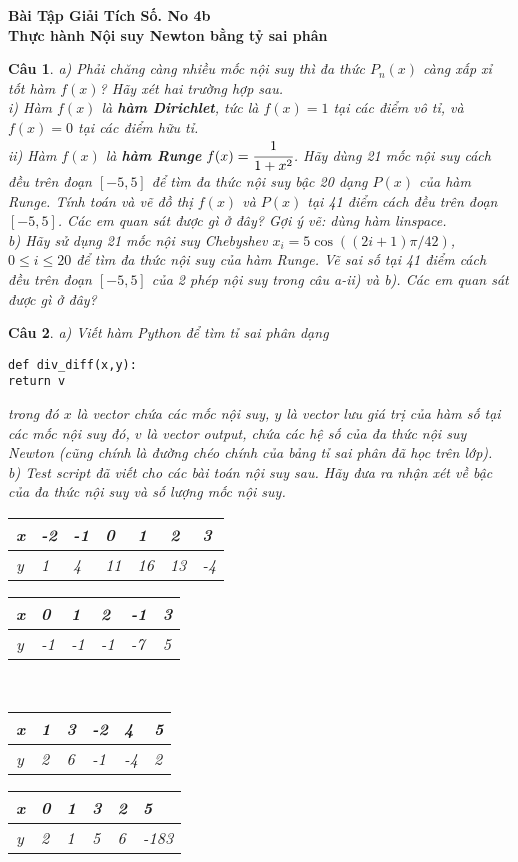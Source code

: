 \documentclass[11pt]{article}
\newtheorem{bt}{Câu}
\begin{document}



\begin{center}
	{\bf Bài Tập Giải Tích Số. No 4b \\ Thực hành Nội suy Newton bằng tỷ sai phân}
\end{center}
%

\begin{bt} %
a) Phải chăng càng nhiều mốc nội suy thì đa thức $P_n(x)$ càng xấp xỉ tốt hàm $f(x)$? Hãy xét hai trường hợp sau.\\
i) Hàm $f(x)$ là \textbf{hàm Dirichlet}, tức là $f(x)=1$ tại các điểm vô tỉ, và $f(x)=0$ tại các điểm hữu tỉ. \\
ii) Hàm $f(x)$ là \textbf{hàm Runge} $f(x) = \cfrac{1}{1+x^2}$. Hãy dùng 21 mốc nội suy cách đều trên đoạn $[-5, 5]$ để tìm đa thức nội suy bậc 20 dạng $P(x)$ của hàm Runge. Tính toán và vẽ đồ thị $f(x)$ và $P(x)$ tại 41 điểm cách đều trên đoạn $[-5, 5]$. Các em quan sát được gì ở đây? Gợi ý vẽ: dùng hàm linspace.\\
b) Hãy sử dụng 21 mốc nội suy Chebyshev $x_i=5\cos((2i+1)\pi/42)$, $0\leq i\leq 20$ để tìm đa thức nội suy của hàm Runge. Vẽ sai số tại 41 điểm cách đều trên đoạn $[-5, 5]$ của 2 phép nội suy trong câu a-ii) và b). Các em quan sát được gì ở đây?
\end{bt}

\begin{bt} a) Viết hàm Python để tìm tỉ sai phân dạng 
%
\begin{lstlisting}[frame=single] 
def div_diff(x,y):
return v
\end{lstlisting}
%
trong đó $x$ là vector chứa các mốc nội suy, $y$ là vector lưu giá trị của hàm số tại các mốc nội suy đó, $v$ là vector output, chứa các hệ số của đa thức nội suy Newton (cũng chính là đường chéo chính của bảng tỉ sai phân đã học trên lớp). \\
b) Test script đã viết cho các bài toán nội suy sau. Hãy đưa ra nhận xét về bậc của đa thức nội suy và số lượng mốc nội suy.  \\
\begin{tabular}[7]{l|l|l|l|l|l|l}
	x & -2 & -1 & 0  & 1  & 2  & 3 \\ \hline 
	y & 1  & 4  & 11 & 16 & 13 & -4
\end{tabular}	
\hfill 
\begin{tabular}[6]{l|l|l|l|l|l}
	x & 0 & 1 & 2  & -1  & 3 \\ \hline 
	y & -1  & -1  & -1 & -7 & 5
\end{tabular}	\\
\begin{tabular}[6]{l|l|l|l|l|l}
	x & 1 & 3 & -2  & 4  & 5 \\ \hline 
	y & 2  & 6  & -1 & -4 & 2
\end{tabular}
\hfill 
\begin{tabular}[6]{l|l|l|l|l|l}
	x & 0 & 1 & 3  & 2  & 5 \\ \hline 
	y & 2  & 1  & 5 & 6 & -183
\end{tabular}\\
\end{bt}
\end{document}
